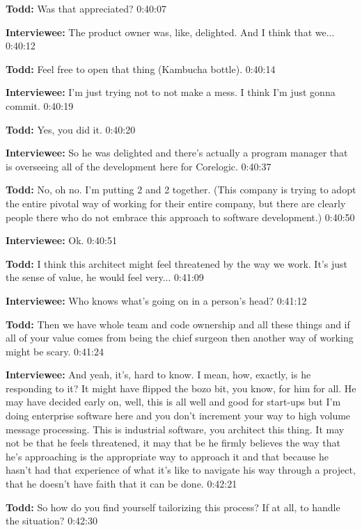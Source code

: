 \textbf{Todd:}  	Was that appreciated?  0:40:07

\textbf{Interviewee:}  	The product owner was, like, delighted.  And I think that we... 0:40:12

\textbf{Todd:}  	Feel free to open that thing (Kambucha bottle).  0:40:14

\textbf{Interviewee:}  	I'm just trying not to not make a mess.  I think I'm just gonna commit.  0:40:19

\textbf{Todd:}  	Yes, you did it.  0:40:20

\textbf{Interviewee:}  So he was delighted and there's actually a program manager that is overseeing all of the development here for Corelogic.  0:40:37

\textbf{Todd:}  	No, oh no. I'm putting 2 and 2 together. (This company is trying to adopt the entire pivotal way of working for their entire company, but there are clearly people there who do not embrace this approach to software development.)  0:40:50

\textbf{Interviewee:}  	Ok.   0:40:51

\textbf{Todd:}  I think this architect might feel threatened by the way we work.  It's just the sense of value, he would feel very...  0:41:09

\textbf{Interviewee:}  	Who knows what's going on in a person's head?  0:41:12

\textbf{Todd:}  	Then we have whole team and code ownership and all these things and if all of your value comes from being the chief surgeon then another way of working might be scary.  0:41:24

\textbf{Interviewee:}  	And yeah, it's, hard to know. I mean, how, exactly, is he responding to it?  It might have flipped  the bozo bit, you know, for him for all. He may have decided early on, well, this is all well and good for start-ups but I'm doing enterprise software here and you don't increment your way to high volume message processing.   This is industrial software, you architect this thing.  It may not be that he feels threatened, it may that be he firmly believes the way that he's approaching is the appropriate way to approach it and that because he hasn't had that experience of what it's like to navigate his way through a project, that he doesn't have faith that it can be done.  0:42:21

\textbf{Todd:}  	So how do you find yourself tailorizing this process?  If at all, to handle the situation? 0:42:30

